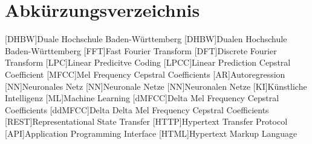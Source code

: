 \section*{Abkürzungsverzeichnis}
\begin{acronym}
  [DHBW]{Duale Hochschule Ba\-den-\-Würt\-tem\-berg}
  [DHBW]{Dualen Hochschule Ba\-den-\-Würt\-tem\-berg}
  [FFT]{Fast Fourier Transform}
  [DFT]{Discrete Fourier Transform}
  [LPC]{Linear Predicitve Coding}
  [LPCC]{Linear Prediction Cepstral Coefficient}
  [MFCC]{Mel Frequency Cepstral Coefficients}
  [AR]{Autoregression}
  [NN]{Neuronales Netz}
  [NN]{Neuronale Netze}
  [NN]{Neuronalen Netze}
  [KI]{Künstliche Intelligenz}
  [ML]{Machine Learning}
  [dMFCC]{Delta Mel Frequency Cepstral Coefficients}
  [ddMFCC]{Delta Delta Mel Frequency Cepstral Coefficients}
  [REST]{Representational State Transfer}
  [HTTP]{Hypertext Transfer Protocol}
  [API]{Application Programming Interface}
  [HTML]{Hypertext Markup Language}
\end{acronym}
\newpage